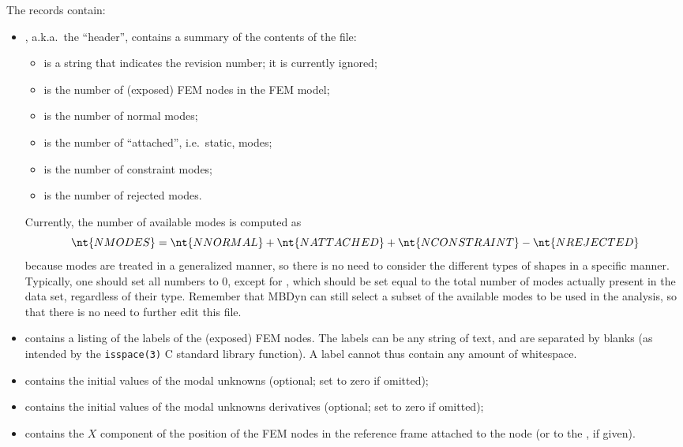 The records contain:
\begin{itemize}
\item {}, a.k.a.\ the ``header'', contains a summary
of the contents of the file:
	\begin{itemize}
	\item {} is a string that indicates the revision number;
	it is currently ignored;
	\item {} is the number of (exposed) FEM nodes 
	in the FEM model;
	\item {} is the number of normal modes;
	\item {} is the number of ``attached'',
	i.e.\ static, modes;
	\item {} is the number of constraint modes;
	\item {} is the number of rejected modes.
	\end{itemize}
Currently, the number of available modes is computed as
\begin{displaymath}
	\nt{NMODES} = \nt{NNORMAL} + \nt{NATTACHED}
		+ \nt{NCONSTRAINT} - \nt{NREJECTED}
\end{displaymath}
because modes are treated in a generalized manner,
so there is no need to consider the different types of shapes
in a specific manner.
Typically, one should set all numbers to 0, except for
, which should be set equal to the total number of modes
actually present in the data set, regardless of their type.
Remember that MBDyn can still select a subset of the available 
modes to be used in the analysis, so that there is no need 
to further edit this file.

\item {} contains a listing of the  labels
of the (exposed) FEM nodes.
The labels can be any string of text, and are separated by blanks
(as intended by the \texttt{isspace(3)} C standard library function).
A label cannot thus contain any amount of whitespace.

\item {} contains the initial values of the 
modal unknowns  (optional; set to zero if omitted);

\item {} contains the initial values of the 
modal unknowns derivatives (optional; set to zero if omitted);

\item {} contains the $X$ component of the position
of the  FEM nodes in the reference frame attached 
to the  node (or to the , if given).


\end{itemize}
